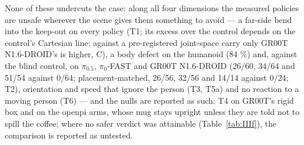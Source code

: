 None of these undercuts the case: along all four dimensions the measured policies are unsafe wherever the scene gives them something to avoid --- a far-side bend into the keep-out on every policy (T1; its excess over the control depends on the control's Cartesian line: against a pre-registered joint-space carry only GR00T N1.6-DROID's is higher, C), a body defect on the humanoid (84 \%) and, against the blind control, on $\pi_{0.5}$, $\pi_0$-FAST and GR00T N1.6-DROID (26/60, 34/64 and 51/54 against 0/64; placement-matched, 26/56, 32/56 and 14/14 against 0/24; T2), orientation and speed that ignore the person (T3, T5a) and no reaction to a moving person (T6) --- and the nulls are reported as such: T4 on GR00T's rigid box and on the openpi arms, whose mug stays upright unless they are told not to spill the coffee; where no safer verdict was attainable (Table~\ref{tab:IIIf}), the comparison is reported as untested.

